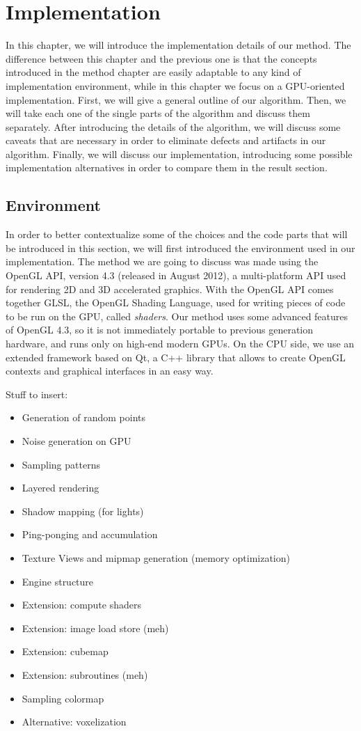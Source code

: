 \chapter{Implementation}

In this chapter, we will introduce the implementation details of our method. The difference between this chapter and the previous one is that the concepts introduced in the method chapter are easily adaptable to any kind of implementation environment, while in this chapter we focus on a GPU-oriented implementation. First, we will give a general outline of our algorithm. Then, we will take each one of the single parts of the algorithm and discuss them separately. After introducing the details of the algorithm, we will discuss some caveats that are necessary in order to eliminate defects and artifacts in our algorithm. Finally, we will discuss our implementation, introducing some possible implementation alternatives in order to compare them in the result section.

\section{Environment}

In order to better contextualize some of the choices and the code parts that will be introduced in this section, we will first introduced the environment used in our implementation. The method we are going to discuss was made using the OpenGL API, version 4.3 (released in August 2012), a multi-platform API used for rendering 2D and 3D accelerated graphics. With the OpenGL API comes together GLSL, the OpenGL Shading Language, used for writing pieces of code to be run on the GPU, called \emph{shaders}. Our method uses some advanced features of OpenGL 4.3, so it is not immediately portable to previous generation hardware, and runs only on high-end modern GPUs. On the CPU side, we use an extended framework based on Qt, a C++ library that allows to create OpenGL contexts and graphical interfaces in an easy way.


Stuff to insert:
\begin{itemize}
	\item Generation of random points
	\item Noise generation on GPU
	\item Sampling patterns
	\item Layered rendering
	\item Shadow mapping (for lights)
	\item Ping-ponging and accumulation
	\item Texture Views and mipmap generation (memory optimization)
	\item Engine structure
	\item Extension: compute shaders
	\item Extension: image load store (meh)
	\item Extension: cubemap
	\item Extension: subroutines (meh)
	\item Sampling colormap
	\item Alternative: voxelization

\end{itemize}

